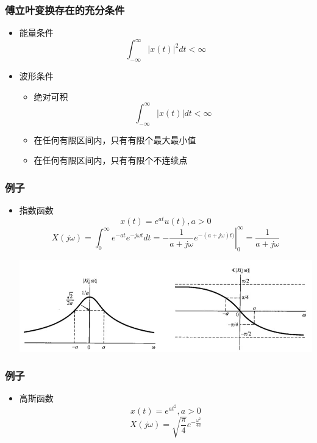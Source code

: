 \documentclass[CJKutf8,dvipsnames,table]{beamer}
\begin{document}
\begin{CJK*}{UTF8}{song}
\begin{frame}
  \end{frame}     
   
  \begin{frame}
    \frametitle{傅立叶变换存在的充分条件}
    \begin{itemize}
    \item 能量条件
    \[
    	 \int_{-\infty}^{\infty}|x(t)|^2dt < \infty
    \]
    \item 波形条件
    \begin{itemize}
    	\item 绝对可积
    	\[
			\int_{-\infty}^{\infty}|x(t)|dt < \infty    
    	\]
    	\item 在任何有限区间内，只有有限个最大最小值
		\item 在任何有限区间内，只有有限个不连续点
   
    	\end{itemize}
    \end{itemize}

  \end{frame} 
     
  \begin{frame}
    \frametitle{例子}
    \begin{itemize}
    \item 指数函数
    \[
		x(t) = e^{at}u(t), a>0    
    \]
    \[
    	X(j\omega) = \int_{0}^{\infty}e^{-at}e^{-j\omega t}dt =\left. -\frac{1}{a+j\omega}e^{-(a+j\omega)t)} \right\rvert_{0}^{\infty} = \frac{1}{a+j\omega}
    \]
    
    	\begin{center}
      	\includegraphics[scale=.37]{ss-c-f4-5}
    	\end{center}
    \end{itemize}

  \end{frame} 
     
  \begin{frame}
    \frametitle{例子}
    \begin{itemize}
    \item 高斯函数
    \[
		x(t) = e^{at^2}, a > 0    
    \]
    \[
    	X(j\omega) = \sqrt{\frac{\pi}{4}}e^{-\frac{\omega^2}{4a}}
    \]
    

\end{itemize}
\end{frame}
\end{CJK*}
\end{document}
